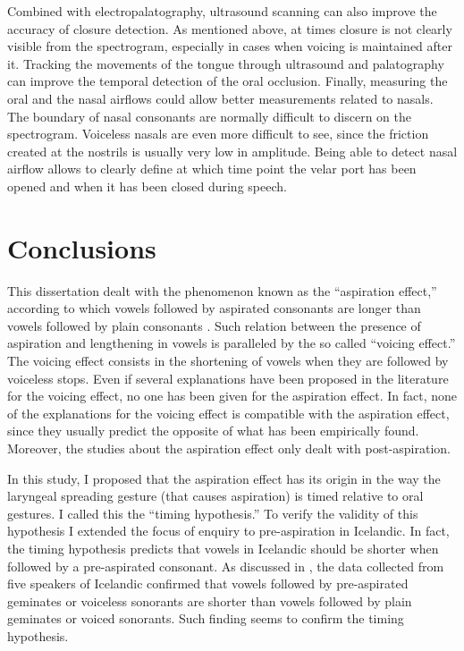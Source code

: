 \documentclass[11pt,a4paper,openany]{memoir}\usepackage[]{graphicx}\usepackage[]{color}
\begin{document}
Combined with electropalatography, ultrasound scanning can also improve the accuracy of closure detection.
As mentioned above, at times closure is not clearly visible from the spectrogram, especially in cases when voicing is maintained after it.
Tracking the movements of the tongue through ultrasound and palatography can improve the temporal detection of the oral occlusion.
Finally, measuring the oral and the nasal airflows could allow better measurements related to nasals.
The boundary of nasal consonants are normally difficult to discern on the spectrogram.
Voiceless nasals are even more difficult to see, since the friction created at the nostrils is usually very low in amplitude.
Being able to detect nasal airflow allows to clearly define at which time point the velar port has been opened and when it has been closed during speech.

















\chapter{Conclusions}
\label{c:conclusions}

This dissertation dealt with the phenomenon known as the ``aspiration effect,'' according to which vowels followed by aspirated consonants are longer than vowels followed by plain consonants \citep{maddieson1976,maddieson1976a}.
Such relation between the presence of aspiration and lengthening in vowels is paralleled by the so called ``voicing effect.''
The voicing effect consists in the shortening of vowels when they are followed by voiceless stops.
Even if several explanations have been proposed in the literature for the voicing effect, no one has been given for the aspiration effect.
In fact, none of the explanations for the voicing effect is compatible with the aspiration effect, since they usually predict the opposite of what has been empirically found.
Moreover, the studies about the aspiration effect only dealt with post-aspiration.

In this study, I proposed that the aspiration effect has its origin in the way the laryngeal spreading gesture (that causes aspiration) is timed relative to oral gestures.
I called this the ``timing hypothesis.''
To verify the validity of this hypothesis I extended the focus of enquiry to pre-aspiration in Icelandic.
In fact, the timing hypothesis predicts that vowels in Icelandic should be shorter when followed by a pre-aspirated consonant.
As discussed in , the data collected from five speakers of Icelandic confirmed that vowels followed by pre-aspirated geminates or voiceless sonorants are shorter than vowels followed by plain geminates or voiced sonorants.
Such finding seems to confirm the timing hypothesis.
\end{document}
